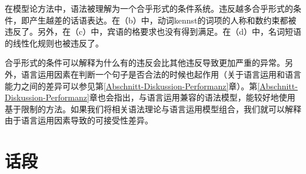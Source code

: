 在模型论方法中，语法被理解为一个合乎形式的条件系统。违反越多合乎形式的条件，即产生越差的话语表达\citep[--27]{PS2001a}。在（b）中，动词kennst的词项的人称和数约束都被违反了。另外，在（c）中，宾语的格要求也没有得到满足。在（d）中，名词短语的线性化规则也被违反了。

合乎形式的条件可以解释为什么有的违反会比其他违反导致更加严重的异常。另外，语言运用因素在判断一个句子是否合法的时候也起作用（关于语言运用和语言能力之间的差异可以参见第\ref{Abschnitt-Diskussion-Performanz}章）。第\ref{Abschnitt-Diskussion-Performanz}章也会指出，与语言运用兼容的语法模型，能较好地使用基于限制的方法。如果我们将相关语法理论与语言运用模型组合，我们就可以解释由于语言运用因素导致的可接受性差异。

\section{话段}

